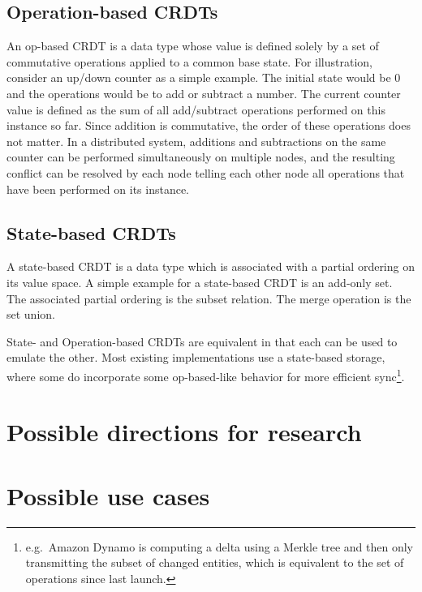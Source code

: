 \documentclass[12pt,a4paper,notitlepage]{article}
\begin{document}
\subsection{Operation-based CRDTs}
An op-based CRDT is a data type whose value is defined solely by a set of commutative operations applied to a common
base state. For illustration, consider an up/down counter as a simple example. The initial state would be $0$ and the
operations would be to add or subtract a number. The current counter value is defined as the sum of all add/subtract
operations performed on this instance so far. Since addition is commutative, the order of these operations does not
matter. In a distributed system, additions and subtractions on the same counter can be performed simultaneously on
multiple nodes, and the resulting conflict can be resolved by each node telling each other node all operations that have
been performed on its instance.

\subsection{State-based CRDTs}
A state-based CRDT is a data type which is associated with a partial ordering on its value space. A simple example for a
state-based CRDT is an add-only set. The associated partial ordering is the subset relation. The merge operation is the
set union.

State- and Operation-based CRDTs are equivalent in that each can be used to emulate the other. Most existing
implementations use a state-based storage, where some do incorporate some op-based-like behavior %
for more efficient sync\footnote{e.g.\ Amazon Dynamo is computing a delta using a Merkle tree and then only transmitting
the subset of changed entities, which is equivalent to the set of operations since last launch.}.

\section{Possible directions for research}

\section{Possible use cases}



\end{document}
